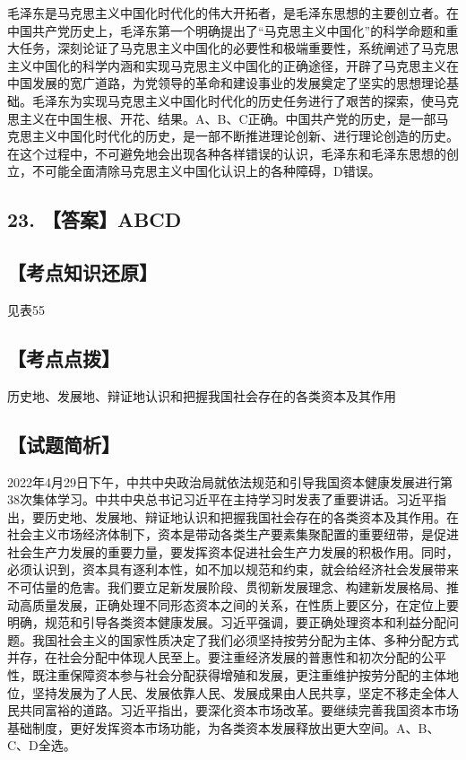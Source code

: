 \documentclass[UTF8,11pt]{ctexart}
\begin{document}
毛泽东是马克思主义中国化时代化的伟大开拓者，是毛泽东思想的主要创立者。在中国共产党历史上，毛泽东第一个明确提出了“马克思主义中国化”的科学命题和重大任务，深刻论证了马克思主义中国化的必要性和极端重要性，系统阐述了马克思主义中国化的科学内涵和实现马克思主义中国化的正确途径，开辟了马克思主义在中国发展的宽广道路，为党领导的革命和建设事业的发展奠定了坚实的思想理论基础。毛泽东为实现马克思主义中国化时代化的历史任务进行了艰苦的探索，使马克思主义在中国生根、开花、结果。A、B、C正确。中国共产党的历史，是一部马克思主义中国化时代化的历史，是一部不断推进理论创新、进行理论创造的历史。在这个过程中，不可避免地会出现各种各样错误的认识，毛泽东和毛泽东思想的创立，不可能全面清除马克思主义中国化认识上的各种障碍，D错误。


\subsection*{23. 【答案】ABCD}

\subsection*{【考点知识还原】}

见表55


\subsection*{【考点点拨】}

历史地、发展地、辩证地认识和把握我国社会存在的各类资本及其作用


\subsection*{【试题简析】}

2022年4月29日下午，中共中央政治局就依法规范和引导我国资本健康发展进行第38次集体学习。中共中央总书记习近平在主持学习时发表了重要讲话。习近平指出，要历史地、发展地、辩证地认识和把握我国社会存在的各类资本及其作用。在社会主义市场经济体制下，资本是带动各类生产要素集聚配置的重要纽带，是促进社会生产力发展的重要力量，要发挥资本促进社会生产力发展的积极作用。同时，必须认识到，资本具有逐利本性，如不加以规范和约束，就会给经济社会发展带来不可估量的危害。我们要立足新发展阶段、贯彻新发展理念、构建新发展格局、推动高质量发展，正确处理不同形态资本之间的关系，在性质上要区分，在定位上要明确，规范和引导各类资本健康发展。习近平强调，要正确处理资本和利益分配问题。我国社会主义的国家性质决定了我们必须坚持按劳分配为主体、多种分配方式并存，在社会分配中体现人民至上。要注重经济发展的普惠性和初次分配的公平性，既注重保障资本参与社会分配获得增殖和发展，更注重维护按劳分配的主体地位，坚持发展为了人民、发展依靠人民、发展成果由人民共享，坚定不移走全体人民共同富裕的道路。习近平指出，要深化资本市场改革。要继续完善我国资本市场基础制度，更好发挥资本市场功能，为各类资本发展释放出更大空间。A、B、C、D全选。
\end{document}
